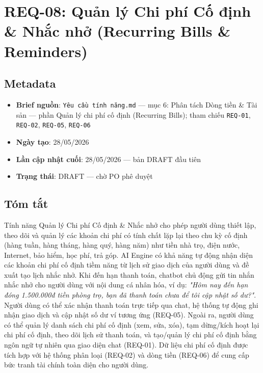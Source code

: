 \section{REQ-08: Quản lý Chi phí Cố định \& Nhắc nhở (Recurring Bills \& Reminders)}



\subsection{Metadata}

\begin{itemize}
\item \textbf{Brief nguồn}: \texttt{Yêu cầu tính năng.md} — mục 6: Phân tách Dòng tiền \& Tài sản — phần Quản lý chi phí cố định (Recurring Bills); tham chiếu \texttt{REQ-01}, \texttt{REQ-02}, \texttt{REQ-05}, \texttt{REQ-06}
\item \textbf{Ngày tạo}: 28/05/2026
\item \textbf{Lần cập nhật cuối}: 28/05/2026 — bản DRAFT đầu tiên
\item \textbf{Trạng thái}: DRAFT — chờ PO phê duyệt
\end{itemize}
\subsection{Tóm tắt}

Tính năng Quản lý Chi phí Cố định \& Nhắc nhở cho phép người dùng thiết lập, theo dõi và quản lý các khoản chi phí có tính chất lặp lại theo chu kỳ cố định (hàng tuần, hàng tháng, hàng quý, hàng năm) như tiền nhà trọ, điện nước, Internet, bảo hiểm, học phí, trả góp. AI Engine có khả năng tự động nhận diện các khoản chi phí cố định tiềm năng từ lịch sử giao dịch của người dùng và đề xuất tạo lịch nhắc nhở. Khi đến hạn thanh toán, chatbot chủ động gửi tin nhắn nhắc nhở cho người dùng với nội dung cá nhân hóa, ví dụ: \textit{"Hôm nay đến hạn đóng 1.500.000đ tiền phòng trọ, bạn đã thanh toán chưa để tôi cập nhật số dư?"}. Người dùng có thể xác nhận thanh toán trực tiếp qua chat, hệ thống tự động ghi nhận giao dịch và cập nhật số dư ví tương ứng (REQ-05). Ngoài ra, người dùng có thể quản lý danh sách chi phí cố định (xem, sửa, xóa), tạm dừng/kích hoạt lại chi phí cố định, theo dõi lịch sử thanh toán, và tạo/quản lý chi phí cố định bằng ngôn ngữ tự nhiên qua giao diện chat (REQ-01). Dữ liệu chi phí cố định được tích hợp với hệ thống phân loại (REQ-02) và dòng tiền (REQ-06) để cung cấp bức tranh tài chính toàn diện cho người dùng.



